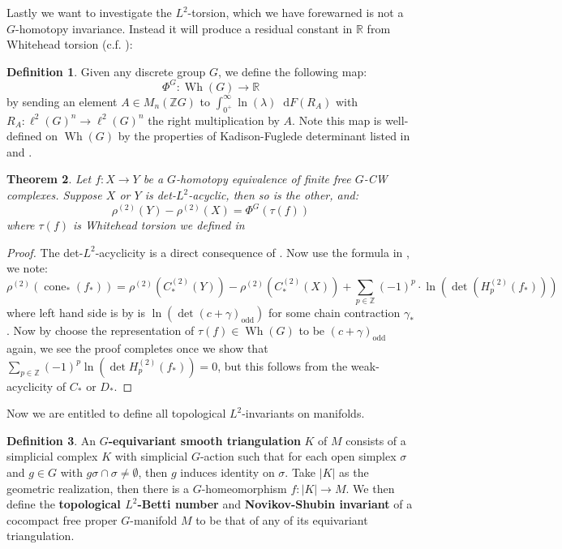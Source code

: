 \documentclass[11pt]{report}
\theoremstyle{definition}
\newtheorem{Def}{Definition}[chapter]
\theoremstyle{plain}
\newtheorem{Theo}[Def]{Theorem}
\DeclareMathOperator{\cone}{cone}
\DeclareMathOperator{\Wh}{Wh}
\newcommand{\real}{\mathbb{R}}
\newcommand{\integer}{\mathbb{Z}}
\newcommand{\odd}{\mathrm{odd}}
\newcommand{\mass}[1]{\mathop{}\mathrm{d}{#1}}
\begin{document}
Lastly we want to investigate the $L^2$-torsion, which we have forewarned is not a $G$-homotopy invariance. Instead it will produce a residual constant in $\real$ from Whitehead torsion (c.f. ):
\begin{Def}
	Given any discrete group $G$, we define the following map:
	\begin{equation*}
	\Phi^G:\Wh(G)\to \real
	\end{equation*}
	by sending an element $A\in M_n(\integer G)$ to $\int_{0^+}^\infty \ln(\lambda) \mass{F(R_A)}$ with $R_A:\ell^2(G)^n\to \ell^2(G)^n$ the right multiplication by $A$. Note this map is well-defined on $\Wh(G)$ by the properties of Kadison-Fuglede determinant listed in  and .
\end{Def}
\begin{Theo}\label{3.93(1)}
	Let $f:X\to Y$ be a $G$-homotopy equivalence of finite free $G$-CW complexes. Suppose $X$ or $Y$ is det-$L^2$-acyclic, then so is the other, and:
	\begin{equation}
	\rho^{(2)}(Y)-\rho^{(2)}(X)=\Phi^G(\tau(f))
	\end{equation}
	where $\tau(f)$ is Whitehead torsion we defined in 
\end{Theo}
\begin{proof}
The det-$L^2$-acyclicity is a direct consequence of . Now use the formula in , we note:
\begin{equation*}
\rho^{(2)}(\cone_*(f_*))=\rho^{(2)}(C_*^{(2)}(Y))-\rho^{(2)}(C_*^{(2)}(X))+\sum_{p\in \integer}(-1)^p\cdot \ln(\det(H_p^{(2)}(f_*)))
\end{equation*}
where left hand side is by  is $\ln(\det(c+\gamma)_\odd)$ for some chain contraction $\gamma_*$. Now by choose the representation of $\tau(f)\in \Wh(G)$ to be $(c+\gamma)_\odd$ again, we see the proof completes once we show that $\sum_{p\in \integer}(-1)^p\ln(\det H^{(2)}_p(f_*))=0$, but this follows from the weak-acyclicity of $C_*$ or $D_*$. 
\end{proof}
Now we are entitled to define all topological $L^2$-invariants on manifolds. 
\begin{Def}
	An \textbf{$G$-equivariant smooth triangulation} $K$ of $M$ consists of a simplicial complex $K$ with simplicial $G$-action such that for each open simplex $\sigma$ and $g\in G$ with $g\sigma\cap \sigma\neq \emptyset$, then $g$ induces identity on $\sigma$. Take $|K|$ as the geometric realization, then there is a $G$-homeomorphism $f:|K|\to M$. We then define the \textbf{topological $L^2$-Betti number} and \textbf{Novikov-Shubin invariant} of a cocompact free proper $G$-manifold $M$ to be that of any of its equivariant triangulation.
\end{Def}
\end{document}
